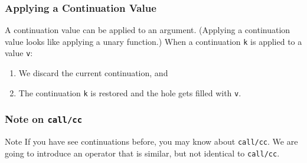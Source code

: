 \documentclass[8pt,pdf]{beamer}
\begin{document}
\begin{frame}[fragile]
\frametitle{Applying a Continuation Value}

A continuation value can be applied to an argument. (Applying a continuation
value looks like applying a unary function.) When a continuation \lstinline|k|
is applied to a value \lstinline|v|:

\begin{enumerate}
  \item We discard the current continuation, and
  \item The continuation \lstinline|k| is restored and the hole
  gets filled with \lstinline|v|.
\end{enumerate}


\end{frame}

\begin{frame}

\frametitle{Note on \texttt{call/cc}}

\begin{alertblock}{Note}
If you have see continuations before, you may know about
\texttt{call/cc}. We are going to introduce an operator that is
similar, but not identical to \texttt{call/cc}.
\end{alertblock}

\end{frame}
\end{document}
